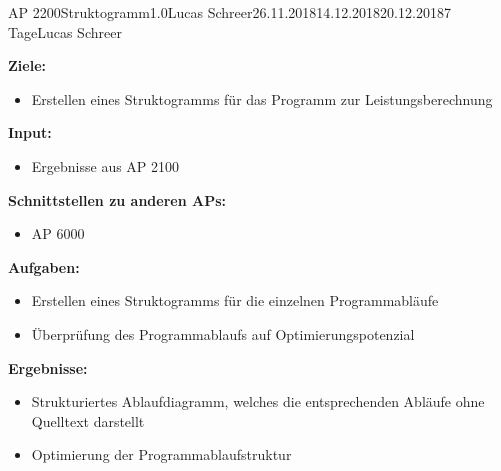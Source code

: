 \clearpage
\begin{wpd}{AP 2200}{Struktogramm}{1.0}{Lucas Schreer}{26.11.2018}{14.12.2018}{20.12.2018}{7 Tage}{Lucas Schreer}
    {
    \textbf{Ziele:}
    \begin{itemize}
        \item Erstellen eines Struktogramms für das Programm zur Leistungsberechnung
    \end{itemize}
    \textbf{Input:}
    \begin{itemize}
        \item Ergebnisse aus AP 2100
    \end{itemize}
    \textbf{Schnittstellen zu anderen APs:}
    \begin{itemize}
        \item AP 6000
    \end{itemize}
    \textbf{Aufgaben:}
    \begin{itemize}
        \item Erstellen eines Struktogramms für die einzelnen Programmabläufe
        \item Überprüfung des Programmablaufs auf Optimierungspotenzial
    \end{itemize}
    \textbf{Ergebnisse:}
    \begin{itemize}
        \item Strukturiertes Ablaufdiagramm, welches die entsprechenden Abläufe ohne Quelltext darstellt
        \item Optimierung der Programmablaufstruktur
    \end{itemize}
    }
\end{wpd}


